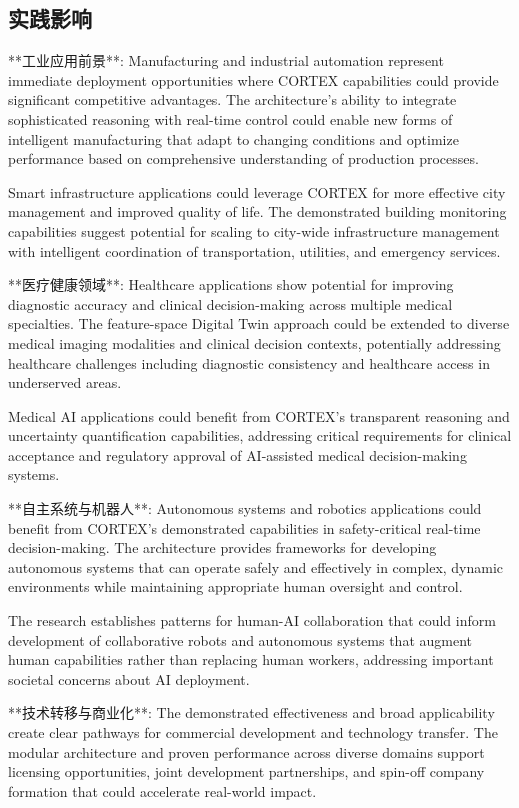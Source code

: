 \subsection{实践影响}

**工业应用前景**:
Manufacturing and industrial automation represent immediate deployment opportunities where CORTEX capabilities could provide significant competitive advantages. The architecture's ability to integrate sophisticated reasoning with real-time control could enable new forms of intelligent manufacturing that adapt to changing conditions and optimize performance based on comprehensive understanding of production processes.

Smart infrastructure applications could leverage CORTEX for more effective city management and improved quality of life. The demonstrated building monitoring capabilities suggest potential for scaling to city-wide infrastructure management with intelligent coordination of transportation, utilities, and emergency services.

**医疗健康领域**:
Healthcare applications show potential for improving diagnostic accuracy and clinical decision-making across multiple medical specialties. The feature-space Digital Twin approach could be extended to diverse medical imaging modalities and clinical decision contexts, potentially addressing healthcare challenges including diagnostic consistency and healthcare access in underserved areas.

Medical AI applications could benefit from CORTEX's transparent reasoning and uncertainty quantification capabilities, addressing critical requirements for clinical acceptance and regulatory approval of AI-assisted medical decision-making systems.

**自主系统与机器人**:
Autonomous systems and robotics applications could benefit from CORTEX's demonstrated capabilities in safety-critical real-time decision-making. The architecture provides frameworks for developing autonomous systems that can operate safely and effectively in complex, dynamic environments while maintaining appropriate human oversight and control.

The research establishes patterns for human-AI collaboration that could inform development of collaborative robots and autonomous systems that augment human capabilities rather than replacing human workers, addressing important societal concerns about AI deployment.

**技术转移与商业化**:
The demonstrated effectiveness and broad applicability create clear pathways for commercial development and technology transfer. The modular architecture and proven performance across diverse domains support licensing opportunities, joint development partnerships, and spin-off company formation that could accelerate real-world impact.

